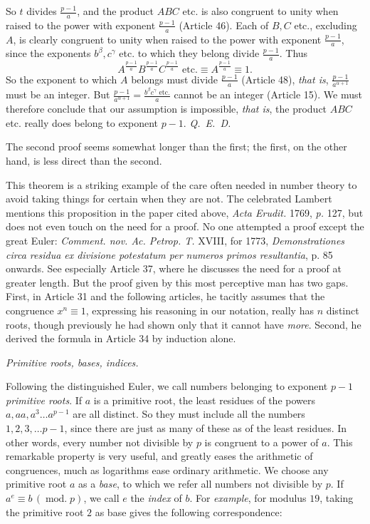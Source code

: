So $t$ divides $\frac{p-1}{a}$, and the product $ABC$ etc. is also congruent to unity when raised to the power with exponent ${\frac{p-1}{a}}$ (Article 46). Each of $B,C$ etc., excluding $A$, is clearly congruent to unity when raised to the power with exponent ${\frac{p-1}{a}}$, since the exponents $b^\beta,c^\gamma$ etc. to which they belong divide $\frac{p-1}{a}$. Thus
\[A^{\frac{p-1}{a}}B^{\frac{p-1}{a}}C^{\frac{p-1}{a}}\text{ etc.}\equiv A^{\frac{p-1}{a}}\equiv1.\]
So the exponent to which $A$ belongs must divide $\frac{p-1}{a}$ (Article 48), \emph{that is}, $\frac{p-1}{a^{\alpha+1}}$ must be an integer. But $\frac{p-1}{a^{\alpha+1}}=\frac{b^\beta c^\gamma\text{ etc.}}{a}$ cannot be an integer (Article 15). We must therefore conclude that our assumption is impossible, \emph{that is}, the product $ABC$ etc. really does belong to exponent $p-1$. \mbox{\emph{Q. E. D.}}

The second proof seems somewhat longer than the first; the first, on the other hand, is less direct than the second.

This theorem is a striking example of the care often needed in number theory to avoid taking things for certain when they are not. The celebrated Lambert mentions this proposition in the paper cited above, \emph{Acta Erudit.} 1769, \emph{p.} 127, but does not even touch on the need for a proof. No one attempted a proof except the great Euler: \emph{Comment. nov. Ac. Petrop. T.} XVIII, for 1773, \emph{Demonstrationes circa residua ex divisione potestatum per numeros primos resultantia}, p. 85 onwards. See especially Article 37, where he discusses the need for a proof at greater length. But the proof given by this most perceptive man has two gaps. First, in Article 31 and the following articles, he tacitly assumes that the congruence $x^n\equiv1$, expressing his reasoning in our notation, really has $n$ distinct roots, though previously he had shown only that it cannot have \emph{more}. Second, he derived the formula in Article 34 by induction alone.

\begin{center}\emph{Primitive roots, bases, indices.}\end{center}

Following the distinguished Euler, we call numbers belonging to exponent $p-1$ \emph{primitive roots}. If $a$ is a primitive root, the least residues of the powers $a,aa,a^3\ldots a^{p-1}$
are all distinct. So they must include all the numbers $1,2,3,\ldots p-1$, since there are just as many of these as of the least residues. In other words, every number not divisible by $p$ is congruent to a power of $a$. This remarkable property is very useful, and greatly eases the arithmetic of congruences, much as logarithms ease ordinary arithmetic. We choose any primitive root $a$ as a \emph{base}, to which we refer all numbers not divisible by $p$. If $a^e\equiv b\,(\operatorname{mod.}p)$, we call $e$ the \emph{index} of $b$. For \emph{example}, for modulus $19$, taking the primitive root $2$ as base gives the following correspondence:

